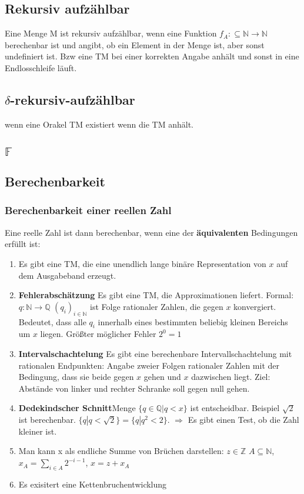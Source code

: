 \documentclass[ngerman]{scrartcl}
\begin{document}
\subsection{Rekursiv aufzählbar} 
Eine Menge M ist rekursiv aufzählbar, wenn eine Funktion $ f_A : \subseteq \mathbb{N} \rightarrow \mathbb{N} $ berechenbar ist und angibt, ob ein Element in der Menge ist, aber sonst undefiniert ist. Bzw eine TM bei einer korrekten Angabe anhält und sonst in eine Endlosschleife läuft.

\subsection{$ \delta $-rekursiv-aufzählbar} wenn eine Orakel TM existiert wenn die TM anhält.

\subsection{$ \mathbb{F} $}

\subsection{Berechenbarkeit} 

\subsubsection{Berechenbarkeit einer reellen Zahl}
Eine reelle Zahl ist dann berechenbar, wenn eine der \textbf{äquivalenten} Bedingungen erfüllt ist:

\begin{enumerate}
  \item Es gibt eine TM, die eine unendlich lange binäre Representation von $ x $ auf dem Ausgabeband erzeugt.  
  \item \textbf{Fehlerabschätzung} Es gibt eine TM, die Approximationen liefert. Formal: $ q:\mathbb{N}\rightarrow \mathbb{Q} $ $ (q_{i})_{i \in \mathbb{N}} $ ist Folge rationaler Zahlen, die gegen $ x $ konvergiert. Bedeutet, dass alle $ q_i $ innerhalb eines bestimmten beliebig kleinen Bereichs um $ x $ liegen. Größter möglicher Fehler $ 2^0 = 1 $
  \item \textbf{Intervalschachtelung} Es gibt eine berechenbare Intervallschachtelung mit rationalen Endpunkten: Angabe zweier Folgen rationaler Zahlen mit der Bedingung, dass sie beide gegen $ x $ gehen und $ x $ dazwischen liegt. Ziel: Abstände von linker und rechter Schranke soll gegen null gehen.
  \item \textbf{Dedekindscher Schnitt}Menge $ \{q \in \mathbb{Q} | q < x \} $ ist entscheidbar. Beispiel $ \sqrt{2} $ ist berechenbar. $ \{ q | q < \sqrt{2} \} = \{ q | q^2 < 2\}$. $ \Rightarrow $ Es gibt einen Test, ob die Zahl kleiner ist.
  \item Man kann x als endliche Summe von Brüchen darstellen: $ z \in \mathbb{Z} $ $ A \subseteq \mathbb{N} $, $ x_A = \sum_{i \in A} 2^{-i-1} $, $ x = z + x_A $
  \item Es exisitert eine Kettenbruchentwicklung
 \end{enumerate}
\end{document}
